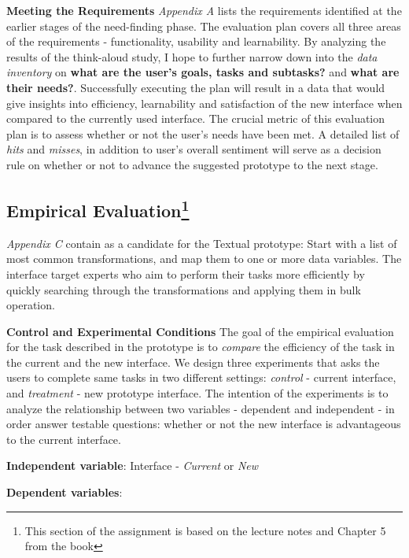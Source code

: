 \documentclass[12pt,letterpaper]{article}
\begin{document}
\textbf{Meeting the Requirements} \textit{Appendix A} lists the requirements identified at the earlier stages of the need-finding phase. The evaluation plan covers all three areas of the requirements - functionality, usability and learnability. By analyzing the results of the think-aloud study, I hope to further narrow down into the \textit{data inventory} on \textbf{what are the user's goals, tasks and subtasks?} and \textbf{what are their needs?}.  Successfully executing the plan will result in a data that would give insights into efficiency, learnability and satisfaction of the new interface when compared to the currently used interface. The crucial metric of this evaluation plan is to assess whether or not the user's needs have been met. A detailed list of \textit{hits} and \textit{misses}, in addition to user's overall sentiment will serve as a decision rule on whether or not to advance the suggested prototype to the next stage. 


\subsection*{Empirical Evaluation\footnote{This section of the assignment is based on the lecture notes and Chapter 5 from the \cite{mackenzie2012human} book}}
\textit{Appendix C}  contain as a candidate for the Textual prototype: Start with a list of most common transformations, and map them to one or more data variables. The interface target experts who aim to perform their tasks more efficiently by quickly searching through the transformations and applying them in bulk operation.

\textbf{Control and Experimental Conditions}
The goal of the empirical evaluation for the task described in the prototype is to \textit{compare} the efficiency of the task in the current and the new interface. We design three experiments that asks the users to complete same tasks in two different settings: \textit{control} - current interface, and \textit{treatment} - new prototype interface. The intention of the experiments is to analyze the relationship between two variables - dependent and independent - in order answer testable questions:  whether or not the new interface is advantageous to the current interface.

\hspace{10mm} \textbf{Independent variable}: Interface - \textit{Current} or \textit{New}  

\hspace{10mm} \textbf{Dependent variables}: 
\end{document}
